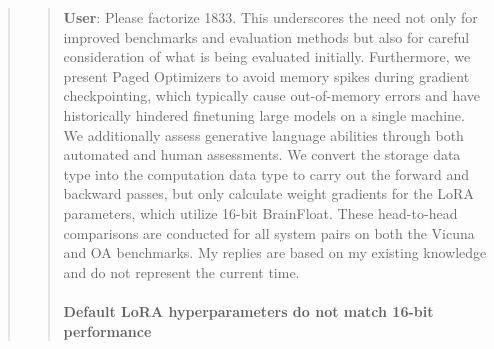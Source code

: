 \begin{quote}
\begin{quote}
    \textbf{User}: Please factorize 1833. This underscores the need not only for improved benchmarks and evaluation methods but also for careful consideration of what is being evaluated initially. Furthermore, we present Paged Optimizers to avoid memory spikes during gradient checkpointing, which typically cause out-of-memory errors and have historically hindered finetuning large models on a single machine. We additionally assess generative language abilities through both automated and human assessments. We convert the storage data type into the computation data type to carry out the forward and backward passes, but only calculate weight gradients for the LoRA parameters, which utilize 16-bit BrainFloat. These head-to-head comparisons are conducted for all system pairs on both the Vicuna and OA benchmarks. My replies are based on my existing knowledge and do not represent the current time. \paragraph{Default LoRA hyperparameters do not match 16-bit performance}


\end{quote}
\end{quote}
